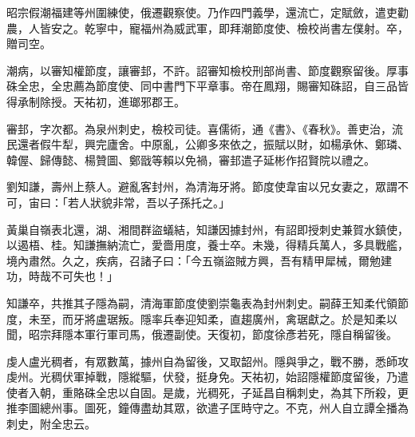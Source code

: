 \begin{pinyinscope}
 昭宗假潮福建等州圍練使，俄遷觀察使。乃作四門義學，還流亡，定賦斂，遣吏勸農，人皆安之。乾寧中，寵福州為威武軍，即拜潮節度使、檢校尚書左僕射。卒，贈司空。



 潮病，以審知權節度，讓審邽，不許。詔審知檢校刑部尚書、節度觀察留後。厚事硃全忠，全忠薦為節度使、同中書門下平章事。帝在鳳翔，賜審知硃詔，自三品皆得承制除授。天祐初，進瑯邪郡王。



 審邽，字次都。為泉州刺史，檢校司徒。喜儒術，通《書》、《春秋》。善吏治，流民還者假牛犁，興完廬舍。中原亂，公卿多來依之，振賦以財，如楊承休、鄭璘、韓偓、歸傳懿、楊贊圖、鄭戩等賴以免禍，審邽遣子延彬作招賢院以禮之。



 劉知謙，壽州上蔡人。避亂客封州，為清海牙將。節度使韋宙以兄女妻之，眾謂不可，宙曰：「若人狀貌非常，吾以子孫托之。」



 黃巢自嶺表北還，湖、湘間群盜蟻結，知謙因據封州，有詔即授刺史兼賀水鎮使，以遏梧、桂。知謙撫納流亡，愛嗇用度，養士卒。未幾，得精兵萬人，多具戰艦，境內肅然。久之，疾病，召諸子曰：「今五嶺盜賊方興，吾有精甲犀械，爾勉建功，時哉不可失也！」



 知謙卒，共推其子隱為嗣，清海軍節度使劉崇龜表為封州刺史。嗣薛王知柔代領節度，未至，而牙將盧琚叛。隱率兵奉迎知柔，直趨廣州，禽琚獻之。於是知柔以聞，昭宗拜隱本軍行軍司馬，俄遷副使。天復初，節度徐彥若死，隱自稱留後。



 虔人盧光稠者，有眾數萬，據州自為留後，又取韶州。隱與爭之，戰不勝，悉師攻虔州。光稠伏軍掉戰，隱縱驅，伏發，挺身免。天祐初，始詔隱權節度留後，乃遣使者入朝，重賂硃全忠以自固。是歲，光稠死，子延昌自稱刺史，為其下所殺，更推李圖總州事。圖死，鐘傳盡劫其眾，欲遣子匡時守之。不克，州人自立譚全播為刺史，附全忠云。



\end{pinyinscope}